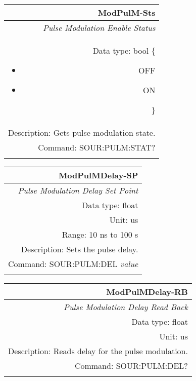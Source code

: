 \documentclass[openany]{article}
\begin{document}
		\begin{tabular}{N}
			\hline
			\bfseries ModPulM-Sts \\ \hline
			\emph{Pulse Modulation Enable Status} \\
			Data type: bool \{\begin{itemize}[noitemsep]
				\small
				\item[] OFF
				\item[] ON
			\end{itemize}\} \\
			Description: Gets pulse modulation state. \\
			Command: SOUR:PULM:STAT? \\
			\\
			
		\end{tabular}


		\begin{tabular}{N}
			\hline
			\bfseries ModPulMDelay-SP \\ \hline
			\emph{Pulse Modulation Delay Set Point} \\
			Data type: float \\
			Unit: us \\ 
			Range: 10 ns to 100 s \\
			Description: Sets the pulse delay. \\
			Command: SOUR:PULM:DEL \emph{value} \\
			\\
			
		\end{tabular}


		\begin{tabular}{N}
			\hline
			\bfseries ModPulMDelay-RB \\ \hline
			\emph{Pulse Modulation Delay Read Back} \\
			Data type: float \\
			Unit: us \\
			Description: Reads delay for the pulse modulation. \\
			Command: SOUR:PULM:DEL? \\
			\\

		\end{tabular}
\end{document}
